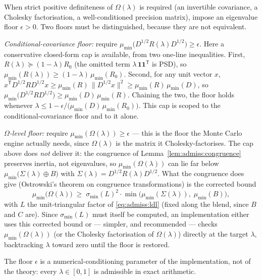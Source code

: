 \begin{remark}
\label{rem:admiss:floor}
When strict positive definiteness of $\Omega(\lambda)$ is required (an
invertible covariance, a Cholesky factorisation, a well-conditioned
precision matrix), impose an eigenvalue floor $\epsilon > 0$. Two floors
must be distinguished, because they are not equivalent.

\emph{Conditional-covariance floor:} require
$\mu_{\min}\bigl(D^{1/2} R(\lambda) D^{1/2}\bigr) \ge \epsilon$. Here a
conservative closed-form cap is available, from two one-line
inequalities. First, $R(\lambda) \succeq (1 - \lambda) R_0$ (the omitted
term $\lambda\, \mathbf{1}\mathbf{1}^{\mathsf T}$ is PSD), so
$\mu_{\min}(R(\lambda)) \ge (1 - \lambda)\, \mu_{\min}(R_0)$. Second, for
any unit vector $x$,
$x^{\mathsf T} D^{1/2} R D^{1/2} x \ge
\mu_{\min}(R)\, \bigl\| D^{1/2} x \bigr\|^2 \ge
\mu_{\min}(R)\, \mu_{\min}(D)$, so
$\mu_{\min}\bigl(D^{1/2} R D^{1/2}\bigr) \ge
\mu_{\min}(D)\, \mu_{\min}(R)$. Chaining the two, the floor holds whenever
$\lambda \le 1 - \epsilon / \bigl(\mu_{\min}(D)\, \mu_{\min}(R_0)\bigr)$.
This cap is scoped to the conditional-covariance floor and to it alone.

\emph{$\Omega$-level floor:} require
$\mu_{\min}(\Omega(\lambda)) \ge \epsilon$ --- this is the floor the
Monte Carlo engine actually needs, since $\Omega(\lambda)$ is the matrix
it Cholesky-factorises. The cap above does \emph{not} deliver it: the
congruence of Lemma~\ref{lem:admiss:congruence} preserves inertia, not
eigenvalues, so $\mu_{\min}(\Omega(\lambda))$ can lie far below
$\mu_{\min}\bigl(\Sigma(\lambda) \oplus B\bigr)$ with
$\Sigma(\lambda) = D^{1/2} R(\lambda) D^{1/2}$. What the congruence does
give (Ostrowski's theorem on congruence transformations) is the corrected
bound
\[
  \mu_{\min}\bigl(\Omega(\lambda)\bigr)
  \;\ge\;
  \sigma_{\min}(L)^2 \cdot
  \min\bigl(\mu_{\min}(\Sigma(\lambda)),\; \mu_{\min}(B)\bigr),
\]
with $L$ the unit-triangular factor of \eqref{eq:admiss:ldl} (fixed along
the blend, since $B$ and $C$ are). Since $\sigma_{\min}(L)$ must itself be
computed, an implementation either uses this corrected bound or ---
simpler, and recommended --- checks $\mu_{\min}(\Omega(\lambda))$ (or the
Cholesky factorisation of $\Omega(\lambda)$) directly at the target
$\lambda$, backtracking $\lambda$ toward zero until the floor is restored.

The floor $\epsilon$ is a numerical-conditioning parameter of the
implementation, not of the theory: every $\lambda \in [0, 1]$ is
admissible in exact arithmetic.
\end{remark}

